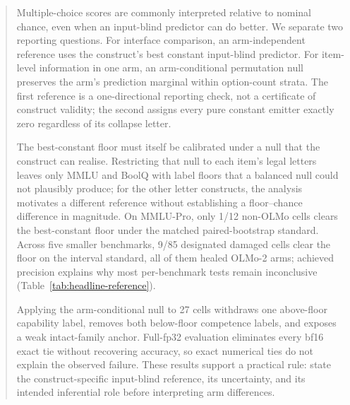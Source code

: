 \begin{abstract}
Multiple-choice scores are commonly interpreted relative to nominal chance, even when an input-blind predictor can do better. We separate two reporting questions. For interface comparison, an arm-independent reference uses the construct's best constant input-blind predictor. For item-level information in one arm, an arm-conditional permutation null preserves the arm's prediction marginal within option-count strata. The first reference is a one-directional reporting check, not a certificate of construct validity; the second assigns every pure constant emitter exactly zero regardless of its collapse letter.

The best-constant floor must itself be calibrated under a null that the construct can realise. Restricting that null to each item's legal letters leaves only MMLU and BoolQ with label floors that a balanced null could not plausibly produce; for the other letter constructs, the analysis motivates a different reference without establishing a floor--chance difference in magnitude. On MMLU-Pro, only 1/12 non-OLMo cells clears the best-constant floor under the matched paired-bootstrap standard. Across five smaller benchmarks, 9/85 designated damaged cells clear the floor on the interval standard, all of them healed OLMo-2 arms; achieved precision explains why most per-benchmark tests remain inconclusive (Table~\ref{tab:headline-reference}).

Applying the arm-conditional null to 27 cells withdraws one above-floor capability label, removes both below-floor competence labels, and exposes a weak intact-family anchor. Full-fp32 evaluation eliminates every bf16 exact tie without recovering accuracy, so exact numerical ties do not explain the observed failure. These results support a practical rule: state the construct-specific input-blind reference, its uncertainty, and its intended inferential role before interpreting arm differences.
\end{abstract}
